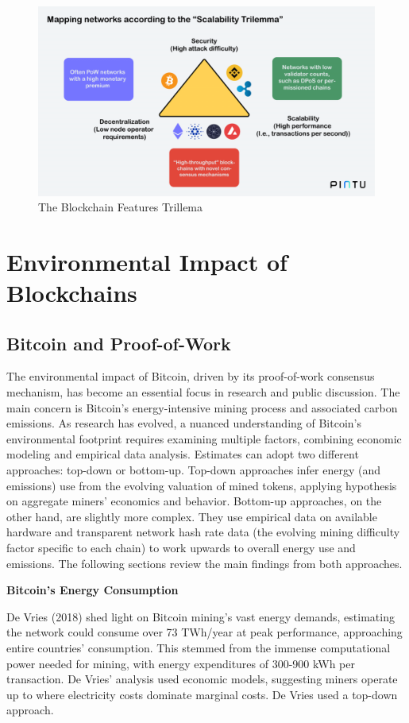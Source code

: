 \documentclass[11pt]{report}
\begin{document}
\begin{figure}[hbt!]
    \centering
    \centerline{\includegraphics[scale=0.23]{figures/blockchain_trilemma.png}}
    \caption[YO]{The Blockchain Features Trillema}
    \label{fig:blockchain_trilemma}
\end{figure}


\section{Environmental Impact of Blockchains}
\subsection{Bitcoin and Proof-of-Work}
The environmental impact of Bitcoin, driven by its proof-of-work consensus mechanism, has become an essential focus in research and public discussion. The main concern is Bitcoin's energy-intensive mining process and associated carbon emissions. As research has evolved, a nuanced understanding of Bitcoin's environmental footprint requires examining multiple factors, combining economic modeling and empirical data analysis. Estimates can adopt two different approaches: top-down or bottom-up. Top-down approaches infer energy (and emissions) use from the evolving valuation of mined tokens, applying hypothesis on aggregate miners' economics and behavior. Bottom-up approaches, on the other hand, are slightly more complex. They use empirical data on available hardware and transparent network hash rate data (the evolving mining difficulty factor specific to each chain) to work upwards to overall energy use and emissions. The following sections review the main findings from both approaches.

\textbf{Bitcoin's Energy Consumption}

De Vries (2018) \cite{devriesBitcoinGrowingEnergy2018} shed light on Bitcoin mining's vast energy demands, estimating the network could consume over 73 TWh/year at peak performance, approaching entire countries' consumption. This stemmed from the immense computational power needed for mining, with energy expenditures of 300-900 kWh per transaction. De Vries' analysis used economic models, suggesting miners operate up to where electricity costs dominate marginal costs. De Vries used a top-down approach.
\end{document}
